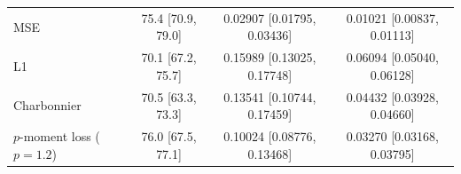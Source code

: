 \label{tab:alpha1_training_dynamics}
\begin{tabular}{@{}lccc@{}}
MSE & 75.4 [70.9, 79.0] & 0.02907 [0.01795, 0.03436] & 0.01021 [0.00837, 0.01113] \\
L1 & 70.1 [67.2, 75.7] & 0.15989 [0.13025, 0.17748] & 0.06094 [0.05040, 0.06128] \\
Charbonnier & 70.5 [63.3, 73.3] & 0.13541 [0.10744, 0.17459] & 0.04432 [0.03928, 0.04660] \\
$p$-moment loss ($p=1.2$) & 76.0 [67.5, 77.1] & 0.10024 [0.08776, 0.13468] & 0.03270 [0.03168, 0.03795] \\
\end{tabular}
